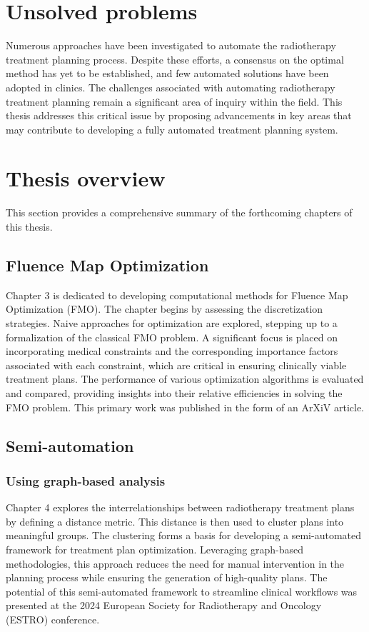 \section{Unsolved problems}
Numerous approaches have been investigated to automate the radiotherapy treatment planning process.
Despite these efforts, a consensus on the optimal method has yet to be established, and few automated solutions have been adopted in clinics.
The challenges associated with automating radiotherapy treatment planning remain a significant area of inquiry within the field.
This thesis addresses this critical issue by proposing advancements in key areas that may contribute to developing a fully automated treatment planning system.

\section{Thesis overview}
This section provides a comprehensive summary of the forthcoming chapters of this thesis.

\subsection{Fluence Map Optimization}
Chapter 3 is dedicated to developing computational methods for Fluence Map Optimization (FMO).
The chapter begins by assessing the discretization strategies.
Naive approaches for optimization are explored, stepping up to a formalization of the classical FMO problem.
A significant focus is placed on incorporating medical constraints and the corresponding importance factors associated with each constraint, which are critical in ensuring clinically viable treatment plans.
The performance of various optimization algorithms is evaluated and compared, providing insights into their relative efficiencies in solving the FMO problem.
This primary work was published in the form of an ArXiV article.

\subsection{Semi-automation}
\subsubsection*{Using graph-based analysis}
Chapter 4 explores the interrelationships between radiotherapy treatment plans by defining a distance metric.
This distance is then used to cluster plans into meaningful groups.
The clustering forms a basis for developing a semi-automated framework for treatment plan optimization.
Leveraging graph-based methodologies, this approach reduces the need for manual intervention in the planning process while ensuring the generation of high-quality plans.
The potential of this semi-automated framework to streamline clinical workflows was presented at the 2024 European Society for Radiotherapy and Oncology (ESTRO) conference.

